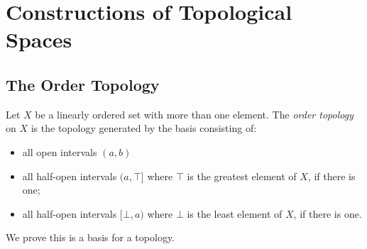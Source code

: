 \chapter{Constructions of Topological Spaces}

\section{The Order Topology}

\begin{df}
  Let $X$ be a linearly ordered set with more than one element. The
  \emph{order
    topology} on $X$ is the topology generated by the basis consisting of:
  \begin{itemize}
    \item all open intervals $(a, b)$
    \item all half-open intervals $(a, \top]$ where $\top$ is the greatest
    element of $X$, if there is one;
    \item all half-open intervals $[\bot, a)$ where $\bot$ is the least
    element of
    $X$, if there is one.
  \end{itemize}

  We prove this is a basis for a topology.
\end{df}

